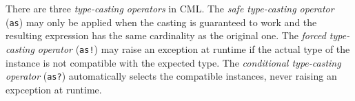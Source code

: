 There are three \emph{type-casting operators} in CML.
The \emph{safe type-casting operator} (\verb|as|)
may only be applied when the casting is guaranteed to work
and the resulting expression has the same cardinality
as the original one.
The \emph{forced type-casting operator} (\verb|as!|)
may raise an exception at runtime
if the actual type of the instance is not compatible with the expected type.
The \emph{conditional type-casting operator} (\verb|as?|)
automatically selects the compatible instances,
never raising an expception at runtime.

